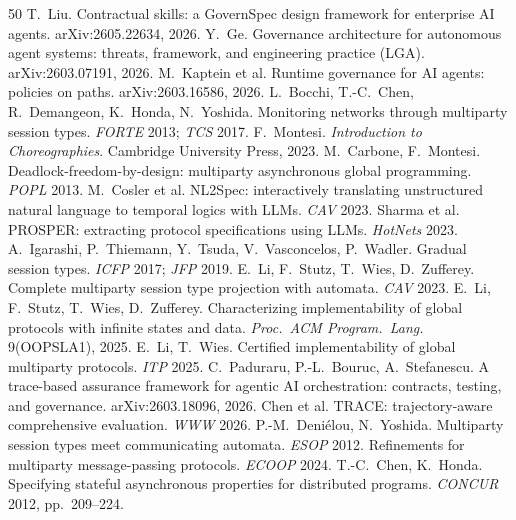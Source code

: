 \documentclass{article}
\begin{document}
\begin{thebibliography}{50}
 T.~Liu. Contractual skills: a GovernSpec design framework for enterprise AI agents. arXiv:2605.22634, 2026.
 Y.~Ge. Governance architecture for autonomous agent systems: threats, framework, and engineering practice (LGA). arXiv:2603.07191, 2026.
 M.~Kaptein et al. Runtime governance for AI agents: policies on paths. arXiv:2603.16586, 2026.
 L.~Bocchi, T.-C.~Chen, R.~Demangeon, K.~Honda, N.~Yoshida. Monitoring networks through multiparty session types. \emph{FORTE} 2013; \emph{TCS} 2017.
 F.~Montesi. \emph{Introduction to Choreographies}. Cambridge University Press, 2023.
 M.~Carbone, F.~Montesi. Deadlock-freedom-by-design: multiparty asynchronous global programming. \emph{POPL} 2013.
 M.~Cosler et al. NL2Spec: interactively translating unstructured natural language to temporal logics with LLMs. \emph{CAV} 2023.
 Sharma et al. PROSPER: extracting protocol specifications using LLMs. \emph{HotNets} 2023.
 A.~Igarashi, P.~Thiemann, Y.~Tsuda, V.~Vasconcelos, P.~Wadler. Gradual session types. \emph{ICFP} 2017; \emph{JFP} 2019.
 E.~Li, F.~Stutz, T.~Wies, D.~Zufferey. Complete multiparty session type projection with automata. \emph{CAV} 2023.
 E.~Li, F.~Stutz, T.~Wies, D.~Zufferey. Characterizing implementability of global protocols with infinite states and data. \emph{Proc.\ ACM Program.\ Lang.} 9(OOPSLA1), 2025.
 E.~Li, T.~Wies. Certified implementability of global multiparty protocols. \emph{ITP} 2025.
 C.~Paduraru, P.-L.~Bouruc, A.~Stefanescu. A trace-based assurance framework for agentic AI orchestration: contracts, testing, and governance. arXiv:2603.18096, 2026.
 Chen et al. TRACE: trajectory-aware comprehensive evaluation. \emph{WWW} 2026.
 P.-M.~Deni\'elou, N.~Yoshida. Multiparty session types meet communicating automata. \emph{ESOP} 2012.
 Refinements for multiparty message-passing protocols. \emph{ECOOP} 2024.
 T.-C.~Chen, K.~Honda. Specifying stateful asynchronous properties for distributed programs. \emph{CONCUR} 2012, pp.~209--224.

\end{thebibliography}
\end{document}
